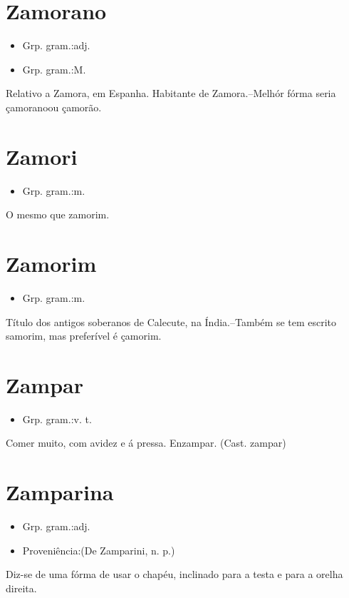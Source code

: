 \section{Zamorano}
\begin{itemize}
\item {Grp. gram.:adj.}
\end{itemize}
\begin{itemize}
\item {Grp. gram.:M.}
\end{itemize}
Relativo a Zamora, em Espanha.
Habitante de Zamora.--Melhór fórma seria \textunderscore çamorano\textunderscore  ou \textunderscore çamorão\textunderscore .
\section{Zamori}
\begin{itemize}
\item {Grp. gram.:m.}
\end{itemize}
O mesmo que \textunderscore zamorim\textunderscore .
\section{Zamorim}
\begin{itemize}
\item {Grp. gram.:m.}
\end{itemize}
Título dos antigos soberanos de Calecute, na Índia.--Também se tem escrito \textunderscore samorim\textunderscore , mas preferível é \textunderscore çamorim\textunderscore .
\section{Zampar}
\begin{itemize}
\item {Grp. gram.:v. t.}
\end{itemize}
Comer muito, com avidez e á pressa.
Enzampar.
(Cast. \textunderscore zampar\textunderscore )
\section{Zamparina}
\begin{itemize}
\item {Grp. gram.:adj.}
\end{itemize}
\begin{itemize}
\item {Proveniência:(De \textunderscore Zamparini\textunderscore , n. p.)}
\end{itemize}
Diz-se de uma fórma de usar o chapéu, inclinado para a testa e para a orelha direita.
